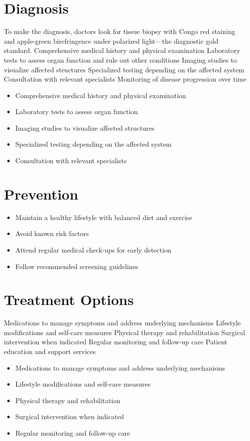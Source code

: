 \section{Diagnosis}
To make the diagnosis, doctors look for tissue biopsy with Congo red staining and apple-green birefringence under polarized light---the diagnostic gold standard. Comprehensive medical history and physical examination Laboratory tests to assess organ function and rule out other conditions Imaging studies to visualize affected structures Specialized testing depending on the affected system Consultation with relevant specialists Monitoring of disease progression over time

\begin{itemize}[noitemsep]
  \item Comprehensive medical history and physical examination
  \item Laboratory tests to assess organ function
  \item Imaging studies to visualize affected structures
  \item Specialized testing depending on the affected system
  \item Consultation with relevant specialists
\end{itemize}
\section{Prevention}
\begin{itemize}[noitemsep]
  \item Maintain a healthy lifestyle with balanced diet and exercise
  \item Avoid known risk factors
  \item Attend regular medical check-ups for early detection
  \item Follow recommended screening guidelines
\end{itemize}
\section{Treatment Options}
Medications to manage symptoms and address underlying mechanisms Lifestyle modifications and self-care measures Physical therapy and rehabilitation Surgical intervention when indicated Regular monitoring and follow-up care Patient education and support services

\begin{itemize}[noitemsep]
  \item Medications to manage symptoms and address underlying mechanisms
  \item Lifestyle modifications and self-care measures
  \item Physical therapy and rehabilitation
  \item Surgical intervention when indicated
  \item Regular monitoring and follow-up care
\end{itemize}
